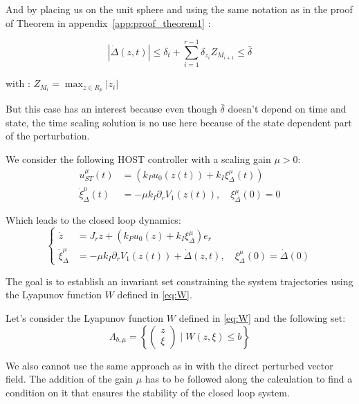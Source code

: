 And by placing us on the unit sphere and using the same notation as in the proof of 
Theorem in appendix~\ref{app:proof_theorem1} :

\begin{equation}
    |\dot{\Delta}(z, t)| \leq \delta_t + \sum_{i=1}^{r-1} \delta_{z_i} Z_{M_{i+1}} \leq \bar{\delta}
\end{equation}

with : \(Z_{M_i} = \max_{z \in R_p} |z_{i}|\)

But this case has an interest because even though \(\bar{\delta}\) doesn't depend on time and state,
the time scaling solution is no use here because of the state dependent part of the perturbation.

We consider the following HOST controller with a scaling gain \(\mu > 0\):
\begin{align}
    u_{ST}^{\mu}(t) &= \left(k_P u_0(z(t)) + k_I \xi^{\mu}_{\Delta}(t)\right) \\
    \dot{\xi}^{\mu}_{\Delta}(t) &= -\mu k_I \partial_r V_1(z(t)), \quad \xi^{\mu}_{\Delta}(0) = 0
\end{align}

Which leads to the closed loop dynamics:
\begin{equation}
    \begin{cases}
        \dot{z} &= J_r z + \left(k_P u_0(z) + k_I \xi^{\mu}_{\Delta}  \right) e_r \\
        \dot{\xi}^{\mu}_{\Delta} &= -\mu k_I \partial_r V_1(z(t)) + \dot{\Delta}(z, t), \quad \xi^{\mu}_{\Delta}(0) = \dot{\Delta}(0)
        \label{eq:closed_loop_dynamicNiclasHOST}
    \end{cases}
\end{equation}

The goal is to establish an invariant set constraining the system trajectories using the Lyapunov function 
\(W\) defined in \ref{eq:W}.

Let's consider the Lyapunov function \(W\) defined in \ref{eq:W} and the following set:
\begin{equation}
    \Lambda_{b, \mu} = \left\{ \begin{pmatrix} z \\ \xi \end{pmatrix} \mid W(z, \xi) \leq b \right\}
\end{equation}

We also cannot use the same approach as in \cite{Laghrouche2017} with the direct perturbed vector field.
The addition of the gain \(\mu\) has to be followed along the calculation to find a condition on it
that ensures the stability of the closed loop system.

